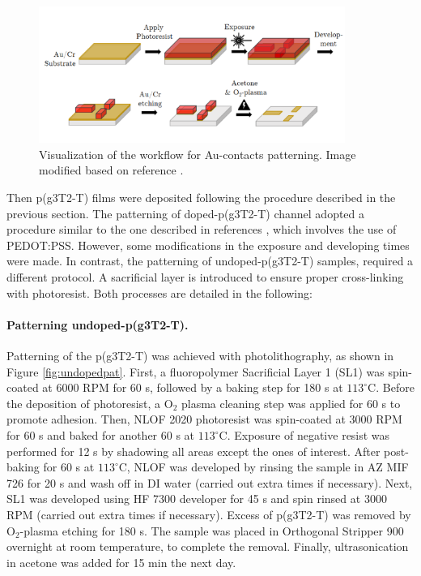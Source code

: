 \begin{figure}[ht]
	\centering
	\includegraphics[width=10cm]{Images/pdf/Au-patterning.pdf}
	\caption[Visualization of the workflow for Au-contacts patterning.]{Visualization of the workflow for Au-contacts patterning. Image modified based on reference \cite{bongartzOrganicElectrochemicalTransistors2021}.}
	\label{fig:aupat}
\end{figure}

Then p(g3T2-T) films were deposited following the procedure described in the previous section. The patterning of doped-p(g3T2-T) channel adopted a procedure similar to the one described in references \cite{weissbachPhotopatternableSolidElectrolyte2022}\cite{bongartzOrganicElectrochemicalTransistors2021}, which involves the use of PEDOT:PSS. However, some modifications in the exposure and developing times were made. In contrast, the patterning of undoped-p(g3T2-T) samples, required a different protocol. A sacrificial layer is introduced to ensure proper cross-linking with photoresist. Both processes are detailed in the following:

\paragraph{Patterning undoped-p(g3T2-T).}Patterning of the p(g3T2-T) was achieved with photolithography, as shown in Figure \ref{fig:undopedpat}. First, a fluoropolymer Sacrificial Layer 1 (SL1) was spin-coated at 6000 RPM for 60 s, followed by a baking step for 180 s at $113^{\circ}$C. Before the deposition of photoresist, a O$_{2}$ plasma cleaning step was applied for 60 s to promote adhesion. Then, NLOF 2020 photoresist was spin-coated at 3000 RPM for 60 s and baked for another 60 s at $113^{\circ}$C. Exposure of negative resist was performed for 12 s by shadowing all areas except the ones of interest. After post-baking for 60 s at $113^{\circ}$C, NLOF was developed by rinsing the sample in AZ MIF 726 for 20 s and wash off in DI water (carried out extra times if necessary). Next, SL1 was developed using HF 7300 developer for 45 s and spin rinsed at 3000 RPM (carried out extra times if necessary). Excess of p(g3T2-T) was removed by O$_{2}$-plasma etching for 180 s. The sample was placed in Orthogonal Stripper 900 overnight at room temperature, to complete the removal. Finally, ultrasonication in acetone was added for 15 min the next day. 

